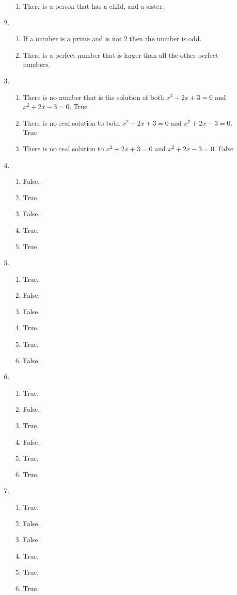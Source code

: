 \begin{enumerate}
\begin{enumerate}
        \item There is a person that has a child, and a sister.
    \end{enumerate}
    \item
    \begin{enumerate}
        \item If a number is a prime and is not 2 then the number is odd.
        \item There is a perfect number that is larger than all the other perfect numbers.
    \end{enumerate}
    \item
    \begin{enumerate}
        \item There is no number that is the solution of both $x^2 + 2x + 3 = 0$ and $x^2 + 2x - 3 = 0$. True
        \item There is no real solution to both $x^2 + 2x + 3 = 0$ and $x^2 + 2x -3 = 0$. True
        \item There is no real solution to $x^2 + 2x + 3 = 0$ and $x^2 + 2x - 3 = 0$. False
    \end{enumerate}
    \item
    \begin{enumerate}
        \item False.
        \item True.
        \item False.
        \item True.
        \item True.
    \end{enumerate}
    \item
    \begin{enumerate}
        \item True.
        \item False.
        \item False.
        \item True.
        \item True.
        \item False.
    \end{enumerate}
    \item
    \begin{enumerate}
        \item True.
        \item False.
        \item True.
        \item False.
        \item True.
        \item True.
    \end{enumerate}
    \item
    \begin{enumerate}
        \item True.
        \item False.
        \item False.
        \item True.
        \item True.
        \item True.
    \end{enumerate}
\end{enumerate}
